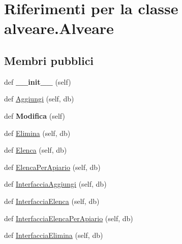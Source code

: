 \hypertarget{classalveare_1_1Alveare}{}\section{Riferimenti per la classe alveare.\+Alveare}
\label{classalveare_1_1Alveare}
\subsection*{Membri pubblici}
\begin{DoxyCompactItemize}
\item 
def {\bfseries \+\_\+\+\_\+init\+\_\+\+\_\+} (self)\hypertarget{classalveare_1_1Alveare_a0e989be377f682b42c586be0b4b7d3dc}{}\label{classalveare_1_1Alveare_a0e989be377f682b42c586be0b4b7d3dc}

\item 
def \hyperlink{classalveare_1_1Alveare_ab96add517787f0990d1a31229b84023e}{Aggiungi} (self, db)
\item 
def {\bfseries Modifica} (self)\hypertarget{classalveare_1_1Alveare_a7ea9f3467476139259dc47d40018c9e2}{}\label{classalveare_1_1Alveare_a7ea9f3467476139259dc47d40018c9e2}

\item 
def \hyperlink{classalveare_1_1Alveare_a9ced552f759d330ebe2001cc90651763}{Elimina} (self, db)
\item 
def \hyperlink{classalveare_1_1Alveare_ae7441be09d9bf0d8c2248a24534b1285}{Elenca} (self, db)
\item 
def \hyperlink{classalveare_1_1Alveare_a94c2d472ef129a78f48584b146c25ad9}{Elenca\+Per\+Apiario} (self, db)
\item 
def \hyperlink{classalveare_1_1Alveare_abf2c97ac838ed0af2326ee4cd4742820}{Interfaccia\+Aggiungi} (self, db)
\item 
def \hyperlink{classalveare_1_1Alveare_aabdd9656e20b585b82c7228ac2333abf}{Interfaccia\+Elenca} (self, db)
\item 
def \hyperlink{classalveare_1_1Alveare_a6ec7088fcbc0c793b13393312214d606}{Interfaccia\+Elenca\+Per\+Apiario} (self, db)
\item 
def \hyperlink{classalveare_1_1Alveare_ab6258c6e80bfb867da2ea5174b8da49f}{Interfaccia\+Elimina} (self, db)
\end{DoxyCompactItemize}
